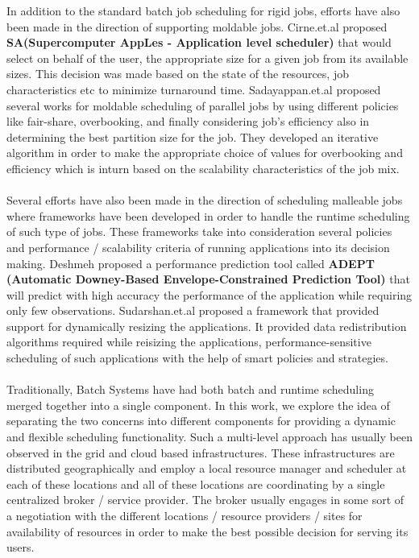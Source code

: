In addition to the standard batch job scheduling for rigid jobs, efforts have also been made in the direction of supporting moldable jobs. Cirne.et.al\cite{wcirne} proposed \textbf{SA(Supercomputer AppLes - Application level scheduler)} that would select on behalf of the user, the appropriate size for a given job from its available sizes. This decision was made based on the state of the resources, job characteristics etc to minimize turnaround time. Sadayappan.et.al\cite{sabin}\cite{srividya}\cite{sudha} proposed several works for moldable scheduling of parallel jobs by using different policies like fair-share, overbooking, and finally considering job's efficiency also in determining the best partition size for the job. They developed an iterative algorithm in order to make the appropriate choice of values for overbooking and efficiency which is inturn based on the scalability characteristics of the job mix.\\ \\
Several efforts have also been made in the direction of scheduling malleable jobs where frameworks have been developed\cite{wcirne1} in order to handle the runtime scheduling of such type of jobs. These frameworks take into consideration several policies and performance / scalability criteria of running applications into its decision making. Deshmeh\cite{deshmeh} proposed a performance prediction tool called \textbf{ADEPT (Automatic Downey-Based Envelope-Constrained Prediction Tool)} that will predict with high accuracy the performance of the application while requiring only few observations. Sudarshan.et.al\cite{sudarshan}\cite{rajesh} proposed a framework that provided support for dynamically resizing the applications. It provided data redistribution algorithms required while reisizing the applications, performance-sensitive scheduling of such applications with the help of smart policies and strategies.\\ \\
Traditionally, Batch Systems have had both batch and runtime scheduling merged together into a single component. In this work, we explore the idea of separating the two concerns into different components for providing a dynamic and flexible scheduling functionality. Such a multi-level approach has usually been observed in the grid and cloud based infrastructures\cite{kwang}\cite{kurowski}\cite{streit}\cite{streit1}. These infrastructures are distributed geographically and employ a local resource manager and scheduler at each of these locations and all of these locations are coordinating by a single centralized broker / service provider. The broker usually engages in some sort of a negotiation\cite{oliver}\cite{roland}\cite{viktor}\cite{rizos} with the different locations / resource providers / sites for availability of resources in order to make the best possible decision for serving its users.
